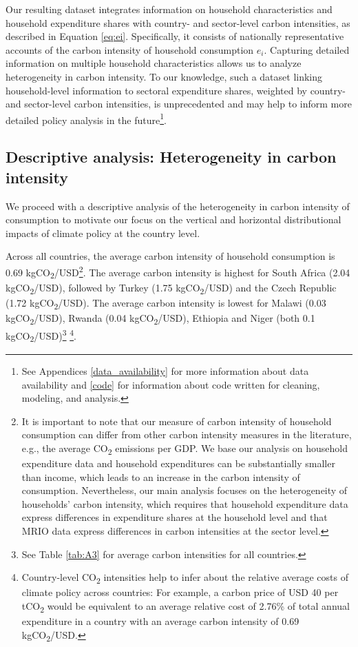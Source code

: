 \documentclass[12pt, a4paper]{article}
\begin{document}
Our resulting dataset integrates information on household characteristics and household expenditure shares with country- and sector-level carbon intensities, as described in Equation \ref{eq:ei}. Specifically, it consists of nationally representative accounts of the carbon intensity of household consumption $e_{i}$. Capturing detailed information on multiple household characteristics allows us to analyze heterogeneity in carbon intensity. To our knowledge, such a dataset linking household-level information to sectoral expenditure shares, weighted by country- and sector-level carbon intensities, is unprecedented and may help to inform more detailed policy analysis in the future\footnote{See Appendices \ref{data_availability} for more information about data availability and \ref{code} for information about code written for cleaning, modeling, and analysis.}.

\subsection{Descriptive analysis: Heterogeneity in carbon intensity} \label{sec:descriptive}

We proceed with a descriptive analysis of the heterogeneity in carbon intensity of consumption to motivate our focus on the vertical and horizontal distributional impacts of climate policy at the country level.

Across all countries, the average carbon intensity of household consumption is 0.69 kgCO\textsubscript{2}/USD\footnote{It is important to note that our measure of carbon intensity of household consumption can differ from other carbon intensity measures in the literature, e.g., the average CO\textsubscript{2} emissions per GDP.  We base our analysis on household expenditure data and household expenditures can be substantially smaller than income, which leads to an increase in the carbon intensity of consumption. Nevertheless, our main analysis focuses on the heterogeneity of households' carbon intensity, which requires that household expenditure data express differences in expenditure shares at the household level and that MRIO data express differences in carbon intensities at the sector level.}. The average carbon intensity is highest for South Africa (2.04 kgCO\textsubscript{2}/USD), followed by Turkey (1.75 kgCO\textsubscript{2}/USD) and the Czech Republic (1.72 kgCO\textsubscript{2}/USD). The average carbon intensity is lowest for Malawi (0.03 kgCO\textsubscript{2}/USD), Rwanda (0.04 kgCO\textsubscript{2}/USD), Ethiopia and Niger (both 0.1 kgCO\textsubscript{2}/USD)\footnote{See Table \ref{tab:A3} for average carbon intensities for all countries.} \footnote{Country-level CO\textsubscript{2} intensities help to infer about the relative average costs of climate policy across countries: For example, a carbon price of USD 40 per tCO\textsubscript{2} \autocite{Stiglitz.2017} would be equivalent to an average relative cost of 2.76\% of total annual expenditure in a country with an average carbon intensity of 0.69 kgCO\textsubscript{2}/USD.}.
\end{document}
